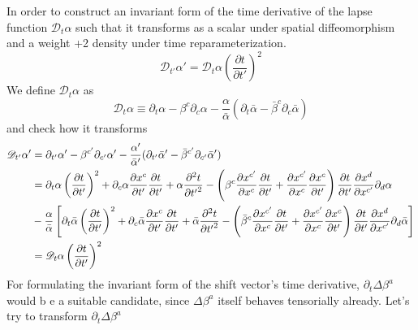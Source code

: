 \documentclass[letterpaper,nofootinbib,prd,amsmath,onecolumn]{revtex4-1}
\begin{document}
In order to construct an invariant form of the time derivative of the lapse function $\mathscr{D}_{t}\alpha$ such that it transforms as a scalar under spatial diffeomorphism and a weight +2 density under time reparameterization.
\[
\mathscr{D}_{t'}\alpha' = \mathscr{D}_{t}\alpha\left(\frac{\partial t}{\partial t'}\right)^{2}
\]
We define $\mathscr{D}_{t}\alpha$ as
\begin{equation}
\mathscr{D}_{t}\alpha \equiv \partial_{t}\alpha - \beta^{c}\partial_{c}\alpha - \frac{\alpha}{{\bar \alpha}}(\partial_{t}{\bar \alpha} - {\bar \beta}^{c}\partial_{c}{\bar \alpha})
\end{equation}
and check how it transforms
\begin{align}
\mathscr{D}_{t'}\alpha' & = \partial_{t'}\alpha' - \beta^{c'}\partial_{c'}\alpha' - \frac{\alpha'}{{\bar \alpha}'}(\partial_{t'}{\bar \alpha}' - {\bar \beta}^{c'}\partial_{c'}{\bar \alpha}')\notag\\
& = \partial_{t}\alpha\left(\frac{\partial t}{\partial t'}\right)^{2} + \partial_{c}\alpha\frac{\partial x^{c}}{\partial t'}\frac{\partial t}{\partial t'} + \alpha\frac{\partial^{2}t}{\partial {t'}^{2}} - \left(\beta^{c}\frac{\partial x^{c'}}{\partial x^{c}}\frac{\partial t}{\partial t'} + \frac{\partial x^{c'}}{\partial x^{c}}\frac{\partial x^{c}}{\partial t'}\right)\frac{\partial t}{\partial t'}\frac{\partial x^{d}}{\partial x^{c'}}\partial_{d}\alpha\notag\\
& - \frac{\alpha}{{\bar \alpha}}\left[\partial_{t}{\bar \alpha}\left(\frac{\partial t}{\partial t'}\right)^{2} + \partial_{c}{\bar \alpha}\frac{\partial x^{c}}{\partial t'}\frac{\partial t}{\partial t'} + {\bar \alpha}\frac{\partial^{2}t}{\partial {t'}^{2}} - \left({\bar\beta}^{c}\frac{\partial x^{c'}}{\partial x^{c}}\frac{\partial t}{\partial t'} + \frac{\partial x^{c'}}{\partial x^{c}}\frac{\partial x^{c}}{\partial t'}\right)\frac{\partial t}{\partial t'}\frac{\partial x^{d}}{\partial x^{c'}}\partial_{d}{\bar\alpha}\right]\notag\\
& = \mathscr{D}_{t}\alpha\left(\frac{\partial t}{\partial t'}\right)^{2}
\end{align}
For formulating the invariant form of the shift vector's time derivative, $\partial_{t}\Delta \beta^{a}$ would b
e a suitable candidate, since $\Delta \beta^{a}$ itself behaves tensorially already. Let's try to transform $\partial_{t} \Delta \beta^{a}$
\end{document}
